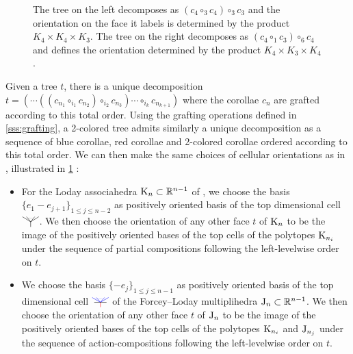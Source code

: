 \documentclass[twoside, 11pt]{amsart}
\theoremstyle{remark}
\begin{document}
\begin{figure}[h!]

\centering

\begin{subfigure}{0.4\textwidth}
\centering
\exampleleftlevelwiseone
\end{subfigure}
\begin{subfigure}{0.4\textwidth}
\centering
\exampleleftlevelwisetwo
\end{subfigure}

\caption{The tree on the left decomposes as $(c_4\circ_3 c_4)\circ_3 c_3$ and the orientation on the face it labels is determined by the product $K_4 \times K_4 \times K_3$. 
The tree on the right decomposes as $ (c_4\circ_1 c_3)\circ_6 c_4$ and defines the orientation determined by the product $K_4 \times K_3 \times K_4$.} 
\label{fig:left-levelwise-order}
\end{figure}


Given a tree $t$, there is a unique decomposition $t=(\cdots ((c_{n_1} \circ_{i_1} c_{n_2})\circ_{i_2}c_{n_3})\cdots \circ_{i_k} c_{n_{k+1}})$ where the corollae $c_n$ are grafted according to this total order. Using the grafting operations defined in \cref{sss:grafting}, a 2-colored tree admits similarly a unique decomposition as a sequence of blue corollae, red corollae and 2-colored corollae ordered according to this total order. 
We can then make the same choices of cellular orientations as in \cite[Section 1.4]{mazuir-I}, illustrated in \cref{fig:left-levelwise-order} :
\begin{itemize}
  \item For the Loday associahedra $\mathrm{K}_n \subset \mathbb{R}^{n-1}$ of \cite{MTTV19}, we choose the basis $\{e_1 - e_{j+1}\}_{1\leq j \leq n-2}$ as positively oriented basis of the top dimensional cell $\arbreop{0.15}$. We then choose the orientation of any other face $t$ of $\mathrm{K}_n$ to be the image of the positively oriented bases of the top cells of the polytopes $\mathrm{K}_{n_i}$ under the sequence of partial compositions following the left-levelwise order on $t$. 
  \item We choose the basis $\{- e_j\}_{1\leq j \leq n-1}$ as positively oriented basis of the top dimensional cell $\arbreopmorph{0.15}$ of the Forcey--Loday multiplihedra $\mathrm{J}_n \subset \mathbb{R}^{n-1}$. We then choose the orientation of any other face $t$ of $\mathrm{J}_n$ to be the image of the positively oriented bases of the top cells of the polytopes $\mathrm{K}_{n_i}$ and $\mathrm{J}_{n_j}$ under the sequence of action-compositions following the left-levelwise order on $t$.
\end{itemize}
\end{document}
